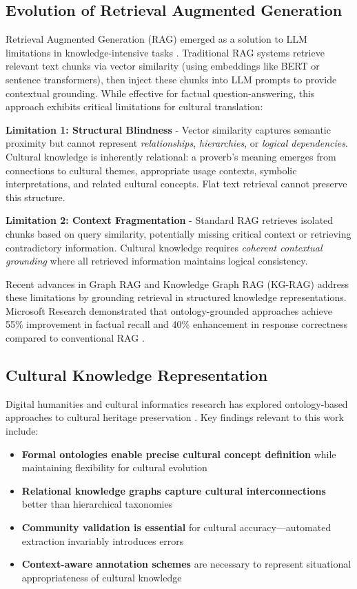 \documentclass[a4paper,11pt]{article}
\begin{document}
\subsection{Evolution of Retrieval Augmented Generation}

Retrieval Augmented Generation (RAG) emerged as a solution to LLM limitations in knowledge-intensive tasks \cite{lewis2020retrieval}. Traditional RAG systems retrieve relevant text chunks via vector similarity (using embeddings like BERT or sentence transformers), then inject these chunks into LLM prompts to provide contextual grounding. While effective for factual question-answering, this approach exhibits critical limitations for cultural translation:

\textbf{Limitation 1: Structural Blindness} - Vector similarity captures semantic proximity but cannot represent \emph{relationships}, \emph{hierarchies}, or \emph{logical dependencies}. Cultural knowledge is inherently relational: a proverb's meaning emerges from connections to cultural themes, appropriate usage contexts, symbolic interpretations, and related cultural concepts. Flat text retrieval cannot preserve this structure.

\textbf{Limitation 2: Context Fragmentation} - Standard RAG retrieves isolated chunks based on query similarity, potentially missing critical context or retrieving contradictory information. Cultural knowledge requires \emph{coherent contextual grounding} where all retrieved information maintains logical consistency.

Recent advances in Graph RAG \cite{edge2024local} and Knowledge Graph RAG (KG-RAG) address these limitations by grounding retrieval in structured knowledge representations. Microsoft Research demonstrated that ontology-grounded approaches achieve 55\% improvement in factual recall and 40\% enhancement in response correctness compared to conventional RAG \cite{chen2024ograg}.

\subsection{Cultural Knowledge Representation}

Digital humanities and cultural informatics research has explored ontology-based approaches to cultural heritage preservation \cite{papatheodorou2008ontology}. Key findings relevant to this work include:

\begin{itemize}
    \item \textbf{Formal ontologies enable precise cultural concept definition} while maintaining flexibility for cultural evolution
    \item \textbf{Relational knowledge graphs capture cultural interconnections} better than hierarchical taxonomies
    \item \textbf{Community validation is essential} for cultural accuracy—automated extraction invariably introduces errors
    \item \textbf{Context-aware annotation schemes} are necessary to represent situational appropriateness of cultural knowledge
\end{itemize}
\end{document}
